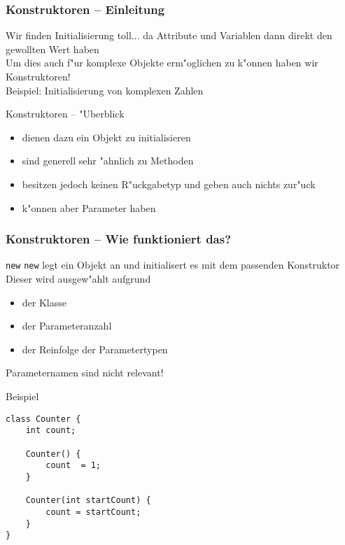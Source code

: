 \documentclass{beamer}
\begin{document}
\begin{frame}
\frametitle{Konstruktoren -- Einleitung}
\begin{block}{Wir finden Initialisierung toll...}
\pause
da Attribute und Variablen dann direkt den gewollten Wert haben\pause\\
Um dies auch f"ur komplexe Objekte erm"oglichen zu k"onnen haben wir Konstruktoren!\\[0.5em]
Beispiel: Initialisierung von komplexen Zahlen
\end{block}

\pause

\begin{block}{Konstruktoren -- "Uberblick}
\begin{itemize}
\item dienen dazu ein Objekt zu initialisieren\\
\item sind generell sehr "ahnlich zu Methoden\\
\item besitzen jedoch \alert{keinen R"uckgabetyp} und geben auch nichts zur"uck\\
\item k"onnen aber Parameter haben
\end{itemize}
\end{block}
\end{frame}


\begin{frame}[containsverbatim]
\frametitle{Konstruktoren -- Wie funktioniert das?}
\begin{block}{\texttt{new}}
\texttt{new} legt ein Objekt an und initialisert es mit dem passenden Konstruktor
Dieser wird ausgew"ahlt aufgrund
\begin{itemize}
\item der Klasse\\
\item der Parameteranzahl\\
\item der Reinfolge der Parametertypen
\end{itemize}
\alert{Parameternamen sind nicht relevant!}
\end{block}

\begin{block}{Beispiel}
\begin{lstlisting}
class Counter {
	int count;

	Counter() {
		count  = 1;
	}

	Counter(int startCount) {
		count = startCount;
	}
}
\end{lstlisting}
\end{block}
\end{frame}
\end{document}
